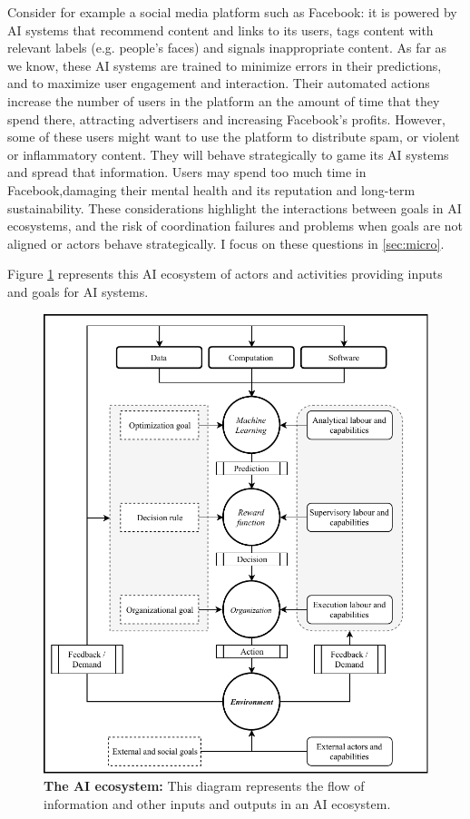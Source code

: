 \documentclass[11pt]{article}
\begin{document}
Consider for example a social media platform such as Facebook: it is powered by AI systems that recommend content and links to its users, tags content with relevant labels (e.g. people's faces) and signals inappropriate content. As far as we know, these AI systems are trained to minimize errors in their predictions, and to maximize user engagement and interaction. Their automated actions increase the number of users in the platform an the amount of time that they spend there, attracting advertisers and increasing Facebook's profits. However, some of these users might want to use the platform to distribute spam, or violent or inflammatory content. They will behave strategically to game its AI systems and spread that information. Users may spend too much time in Facebook,damaging their mental health and its reputation and long-term sustainability. These considerations highlight the interactions between goals in AI ecosystems, and the risk of coordination failures and problems when goals are not aligned or actors behave strategically. I focus on these questions in \ref{sec:micro}.

Figure \ref{fig:ecosystem} represents this AI ecosystem of actors and activities providing inputs and goals for AI systems.

\begin{figure}
    \centering
    \includegraphics{ai_diagram.pdf}
    \caption{\textbf{The AI ecosystem:} This diagram represents the flow of information and other inputs and outputs in an AI ecosystem.}
    \label{fig:ecosystem}
\end{figure}
\end{document}
